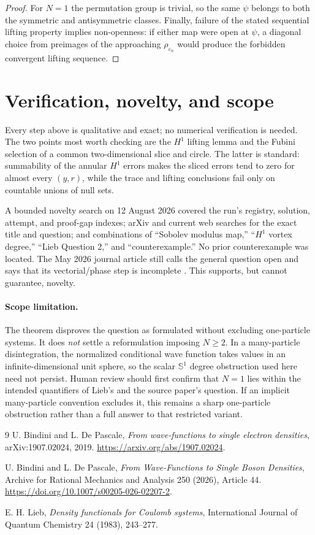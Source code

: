 \documentclass[11pt]{article}
\newcommand{\Sph}{\mathbb S^1}
\begin{document}
\begin{proof}
For $N=1$ the permutation group is trivial, so the same $\psi$ belongs to both the symmetric and antisymmetric classes.  Finally, failure of the stated sequential lifting property implies non-openness: if either map were open at $\psi$, a diagonal choice from preimages of the approaching $\rho_{\varepsilon_n}$ would produce the forbidden convergent lifting sequence.
\end{proof}

\section{Verification, novelty, and scope}

Every step above is qualitative and exact; no numerical verification is needed.  The two points most worth checking are the $H^1$ lifting lemma and the Fubini selection of a common two-dimensional slice and circle.  The latter is standard: summability of the annular $H^1$ errors makes the sliced errors tend to zero for almost every $(y,r)$, while the trace and lifting conclusions fail only on countable unions of null sets.

A bounded novelty search on 12 August 2026 covered the run's registry, solution, attempt, and proof-gap indexes; arXiv and current web searches for the exact title and question; and combinations of ``Sobolev modulus map,'' ``$H^1$ vortex degree,'' ``Lieb Question 2,'' and ``counterexample.''  No prior counterexample was located.  The May 2026 journal article still calls the general question open and says that its vectorial/phase step is incomplete \cite{journal}.  This supports, but cannot guarantee, novelty.

\paragraph{Scope limitation.}
The theorem disproves the question as formulated without excluding one-particle systems.  It does \emph{not} settle a reformulation imposing $N\geq2$.  In a many-particle disintegration, the normalized conditional wave function takes values in an infinite-dimensional unit sphere, so the scalar $\Sph$ degree obstruction used here need not persist.  Human review should first confirm that $N=1$ lies within the intended quantifiers of Lieb's and the source paper's question.  If an implicit many-particle convention excludes it, this remains a sharp one-particle obstruction rather than a full answer to that restricted variant.

\sloppy
\begin{thebibliography}{9}
U. Bindini and L. De Pascale,
\emph{From wave-functions to single electron densities},
arXiv:1907.02024, 2019.
\url{https://arxiv.org/abs/1907.02024}.

U. Bindini and L. De Pascale,
\emph{From Wave-Functions to Single Boson Densities},
Archive for Rational Mechanics and Analysis 250 (2026), Article 44.
\url{https://doi.org/10.1007/s00205-026-02207-2}.

E. H. Lieb,
\emph{Density functionals for Coulomb systems},
International Journal of Quantum Chemistry 24 (1983), 243--277.
\end{thebibliography}
\end{document}
